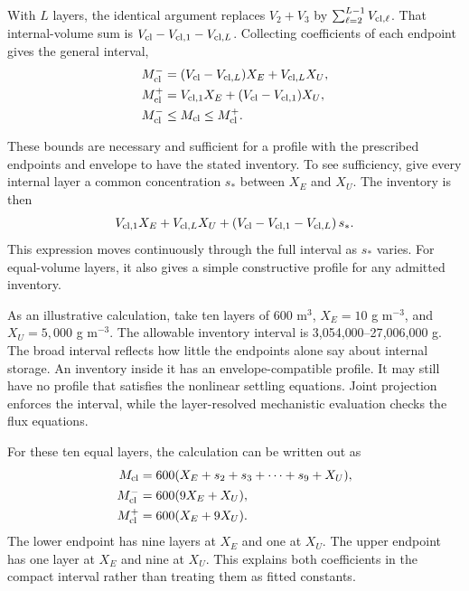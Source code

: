 With $L$ layers, the identical argument replaces $V_2+V_3$ by $\sum_{\ell=2}^{L-1}V_{{\rm cl},\ell}$. That internal-volume sum is $V_{\rm cl}-V_{{\rm cl},1}-V_{{\rm cl},L}$. Collecting coefficients of each endpoint gives the general interval,
\begin{align}
\equationname{Lower clarifier-inventory bound from endpoint concentrations}
M_{\rm cl}^{-}&=(V_{\rm cl}-V_{{\rm cl},L})X_E+V_{{\rm cl},L}X_U,\\
\equationname{Upper clarifier-inventory bound from endpoint concentrations}
M_{\rm cl}^{+}&=V_{{\rm cl},1}X_E+(V_{\rm cl}-V_{{\rm cl},1})X_U,\\
\equationname{Admissible interval for the clarifier solids inventory}
M_{\rm cl}^{-}&\le M_{\rm cl}\le M_{\rm cl}^{+}.
\label{eq:plant_inventory_bounds}
\end{align}

These bounds are necessary and sufficient for a profile with the prescribed endpoints and envelope to have the stated inventory. To see sufficiency, give every internal layer a common concentration $s_*$ between $X_E$ and $X_U$. The inventory is then
\begin{equation}
\equationname{Inventory represented by a common interior-layer concentration}
V_{{\rm cl},1}X_E+V_{{\rm cl},L}X_U
+\left(V_{\rm cl}-V_{{\rm cl},1}-V_{{\rm cl},L}\right)s_*.
\end{equation}
This expression moves continuously through the full interval as $s_*$ varies. For equal-volume layers, it also gives a simple constructive profile for any admitted inventory.

As an illustrative calculation, take ten layers of 600 m$^3$, $X_E=10$ g m$^{-3}$, and $X_U=5{,}000$ g m$^{-3}$. The allowable inventory interval is 3{,}054{,}000--27{,}006{,}000 g. The broad interval reflects how little the endpoints alone say about internal storage. An inventory inside it has an envelope-compatible profile. It may still have no profile that satisfies the nonlinear settling equations. Joint projection enforces the interval, while the layer-resolved mechanistic evaluation checks the flux equations.

For these ten equal layers, the calculation can be written out as
\begin{align}
\equationname{Solids inventory of the illustrative ten-layer clarifier}
M_{\rm cl}&=600(X_E+s_2+s_3+\cdots+s_9+X_U),\\
\equationname{Lower inventory bound for the illustrative ten-layer clarifier}
M_{\rm cl}^{-}&=600(9X_E+X_U),\\
\equationname{Upper inventory bound for the illustrative ten-layer clarifier}
M_{\rm cl}^{+}&=600(X_E+9X_U).
\end{align}
The lower endpoint has nine layers at $X_E$ and one at $X_U$. The upper endpoint has one layer at $X_E$ and nine at $X_U$. This explains both coefficients in the compact interval rather than treating them as fitted constants.

